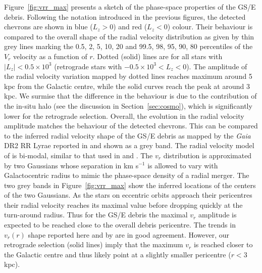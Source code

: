 \documentclass[a4paper,useAMS,usenatbib]{mnras}
\begin{document}
Figure~\ref{fig:vrr_max} presents a sketch of the phase-space properties of the GS/E debris. Following the notation introduced in the previous figures, the detected chevrons are shown in blue ($L_z>0$) and red ($L_z<0$) colour. Their behaviour is compared to the overall shape of the radial velocity distribution as given by thin grey lines marking the 0.5, 2, 5, 10, 20 and 99.5, 98, 95, 90, 80 percentiles of the $V_r$ velocity as a function of $r$. Dotted (solid) lines are for all stars with $|L_z|<0.5\times10^3$ (retrograde stars with $-0.5\times10^3<L_z<0$). The amplitude of the radial velocity variation mapped by dotted lines reaches maximum around 5 kpc from the Galactic centre, while the solid curves reach the peak at around 3 kpc. We surmise that the difference in the behaviour is due to the contribution of the in-situ halo (see the discussion in Section~\ref{sec:cosmo}), which is significantly lower for the retrograde selection. Overall, the evolution in the radial velocity amplitude matches the behaviour of the detected chevrons. This can be compared to the inferred radial velocity shape of the GS/E debris as mapped by the {\it Gaia} DR2 RR Lyrae reported in \citet{Iorio2021} and shown as a grey band. The radial velocity model of \citet{Iorio2021} is bi-modal, similar to that used in \citet{Lancaster2019} and \citet{Necib2019}. The $v_r$ distribution is approximated by two Gaussians whose separation in km s$^{-1}$ is allowed to vary with Galactocentric radius to mimic the phase-space density of a radial merger. The two grey bands in Figure~\ref{fig:vrr_max} show the inferred locations of the centers of the two Gaussians. As the stars on eccentric orbits approach their pericentres their radial velocity reaches its maximal value before dropping quickly at the turn-around radius. Thus for the GS/E debris the maximal $v_r$ amplitude is expected to be reached close to the overall debris pericentre. The trends in $v_r(r)$ shape reported here and by \citet{Iorio2021} are in good agreement. However, our retrograde selection (solid lines) imply that the maximum $v_r$ is reached closer to the Galactic centre and thus likely point at a slightly smaller pericentre ($r<3$ kpc).
\end{document}
